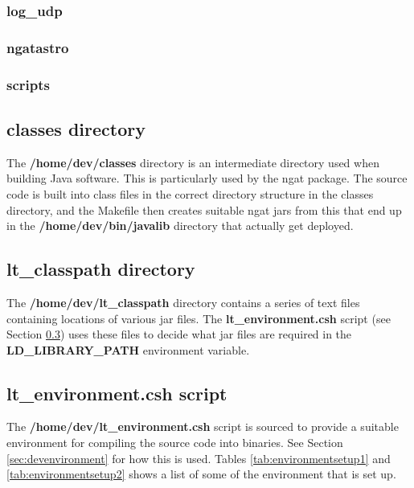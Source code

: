 \documentclass[10pt,a4paper]{article}
\begin{document}
\subsubsection{log\_udp}

\subsubsection{ngatastro}

\subsubsection{scripts}


\subsection{classes directory}

The {\bf /home/dev/classes} directory is an intermediate directory used when building Java software. This is particularly used by the ngat package. The source code is built into class files in the correct directory structure in the classes directory, and the Makefile then creates suitable ngat jars from this that end up in the {\bf /home/dev/bin/javalib} directory that actually get deployed.

\subsection{lt\_classpath directory}

The {\bf /home/dev/lt\_classpath} directory contains a series of text files containing locations of various jar files.
The {\bf lt\_environment.csh} script (see Section \ref{sec:ltenvironment.csh}) uses these files to decide what jar files are required in the {\bf LD\_LIBRARY\_PATH} environment variable.

\subsection{lt\_environment.csh script}
\label{sec:ltenvironment.csh}

The {\bf /home/dev/lt\_environment.csh} script is sourced to provide a suitable environment for compiling the source code into binaries. See Section \ref{sec:devenvironment} for how this is used. Tables \ref{tab:environmentsetup1} and \ref{tab:environmentsetup2} shows a list of some of the environment that is set up.
\end{document}
